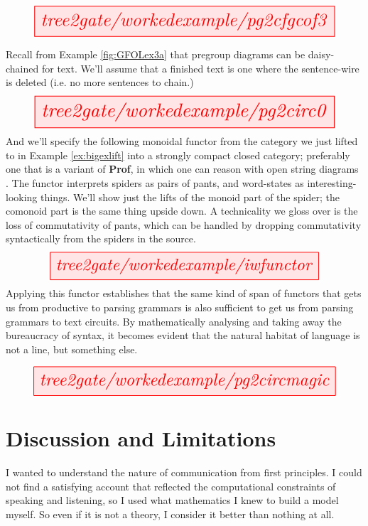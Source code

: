 \begin{myboxB}
\[\resizebox{0.95\textwidth}{!}{\tikzfig{tree2gate/workedexample/pg2cfgcof3}}\]
\end{myboxB}

\begin{myboxR}
\begin{example}
Recall from Example \ref{fig:GFOLex3a} that pregroup diagrams can be daisy-chained for text. We'll assume that a finished text is one where the sentence-wire is deleted (i.e. no more sentences to chain.)
\[\resizebox{0.95\textwidth}{!}{\tikzfig{tree2gate/workedexample/pg2circ0}}\]
And we'll specify the following monoidal functor from the category we just lifted to in Example \ref{ex:bigexlift} into a strongly compact closed category; preferably one that is a variant of \textbf{Prof}, in which one can reason with open string diagrams \citep{hu_external_nodate,roman_open_2021}. The functor interprets spiders as pairs of pants, and word-states as interesting-looking things. We'll show just the lifts of the monoid part of the spider; the comonoid part is the same thing upside down. A technicality we gloss over is the loss of commutativity of pants, which can be handled by dropping commutativity syntactically from the spiders in the source.
\[\resizebox{0.85\textwidth}{!}{\tikzfig{tree2gate/workedexample/iwfunctor}}\]
Applying this functor establishes that the same kind of span of functors that gets us from productive to parsing grammars is also sufficient to get us from parsing grammars to text circuits. By mathematically analysing and taking away the bureaucracy of syntax, it becomes evident that the natural habitat of language is not a line, but something else.
\end{example}
\end{myboxR}

\begin{myboxR}
\[\resizebox{0.95\textwidth}{!}{\tikzfig{tree2gate/workedexample/pg2circmagic}}\]
\end{myboxR}

\clearpage

\section{Discussion and Limitations}


I wanted to understand the nature of communication from first principles. I could not find a satisfying account that reflected the computational constraints of speaking and listening, so I used what mathematics I knew to build a model myself. So even if it is not a theory, I consider it better than nothing at all.\\

